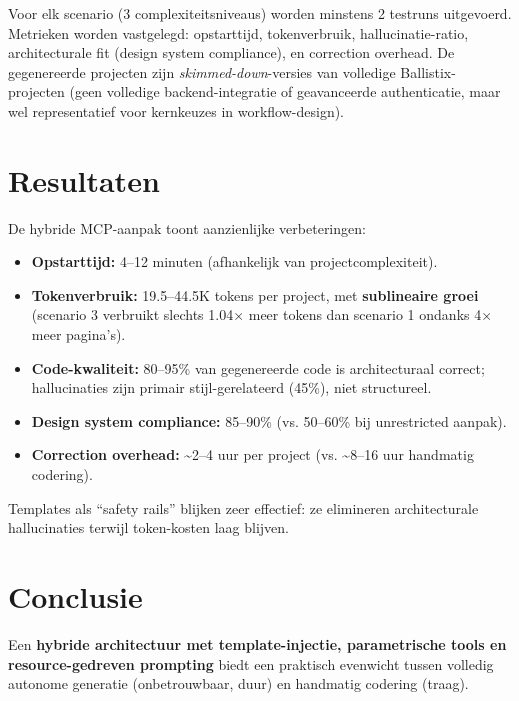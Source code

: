 Voor elk scenario (3 complexiteitsniveaus) worden minstens 2 testruns uitgevoerd. Metrieken worden vastgelegd: opstarttijd, tokenverbruik, hallucinatie-ratio, architecturale fit (design system compliance), en correction overhead. De gegenereerde projecten zijn \textit{skimmed-down}-versies van volledige Ballistix-projecten (geen volledige backend-integratie of geavanceerde authenticatie, maar wel representatief voor kernkeuzes in workflow-design).

\section*{Resultaten}

De hybride MCP-aanpak toont aanzienlijke verbeteringen:

\begin{itemize}
  \item \textbf{Opstarttijd:} 4--12 minuten (afhankelijk van projectcomplexiteit).
  
  \item \textbf{Tokenverbruik:} 19.5--44.5K tokens per project, met \textbf{sublineaire groei} (scenario 3 verbruikt slechts 1.04× meer tokens dan scenario 1 ondanks 4× meer pagina's).
  
  \item \textbf{Code-kwaliteit:} 80--95\% van gegenereerde code is architecturaal correct; hallucinaties zijn primair stijl-gerelateerd (45\%), niet structureel.
  
  \item \textbf{Design system compliance:} 85--90\% (vs. 50--60\% bij unrestricted aanpak).
  
  \item \textbf{Correction overhead:} \textasciitilde 2--4 uur per project (vs. \textasciitilde 8--16 uur handmatig codering).
\end{itemize}

Templates als ``safety rails'' blijken zeer effectief: ze elimineren architecturale hallucinaties terwijl token-kosten laag blijven.

\section*{Conclusie}

Een \textbf{hybride architectuur met template-injectie, parametrische tools en resource-gedreven prompting} biedt een praktisch evenwicht tussen volledig autonome generatie (onbetrouwbaar, duur) en handmatig codering (traag). 

